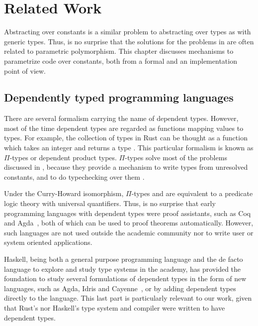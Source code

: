 \newcommand{\pdtn}[1] { \langle \text{#1} \rangle }

\chapter{Related Work}

\label{chap:related_work}

Abstracting over constants is a similar problem to abstracting over types as
with generic types. Thus, is no surprise that the solutions for the problems in
 are often related to parametric polymorphism. This
chapter discusses mechanisms to parametrize code over constants, both from a
formal and an implementation point of view.

\section{Dependently typed programming languages}

There are several formalism carrying the name of dependent types. However, most
of the time dependent types are regarded as functions mapping values to types.
For example, the collection of types \inrust{[N; i32]} in Rust can be thought
as a function which takes an integer  and returns a type \inrust{[N;
i32]}. This particular formalism is known as $\Pi$-types or dependent product
types. $\Pi$-types solve most of the problems discussed in
, because they provide a mechanism to write types from
unresolved constants, and to do typechecking over them \cite{pierce}.

Under the Curry-Howard isomorphism, $\Pi$-types and are equivalent to a
predicate logic theory with universal quantifiers. Thus, is no surprise that
early programming languages with dependent types were proof assistants, such as
Coq and Agda~\cite{agda}, both of which can be used to proof theorems
automatically.  However, such languages are not used outside the academic
community nor to write user or system oriented applications.

Haskell, being both a general purpose programming language and the de facto
language to explore and study type systems in the academy, has provided the
foundation to study several formulations of dependent types in the form of new
languages, such as Agda, Idris \cite{idris} and Cayenne~\cite{cayenne}, or by
adding dependent types directly to the language. This last part is particularly
relevant to our work, given that Rust's nor Haskell's type system and compiler
were written to have dependent types.

